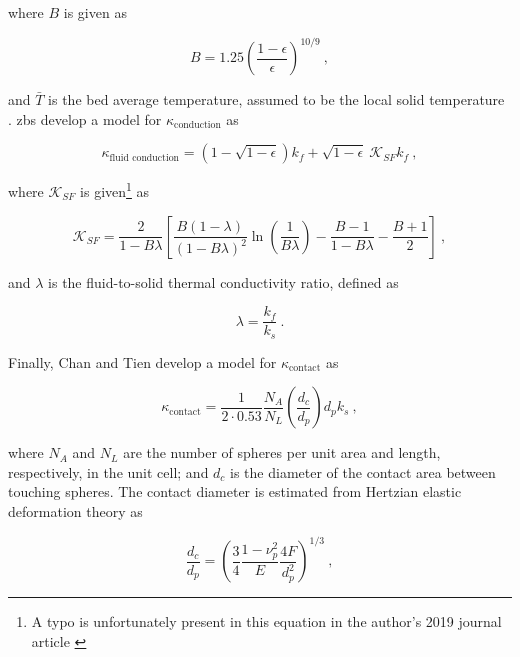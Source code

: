 \noindent where \(B\) is given as

\begin{equation}
\label{eq:KappaB}
B=1.25\left(\frac{1-\epsilon}{\epsilon}\right)^{10/9}\ ,
\end{equation}

\noindent and \(\bar{T}\) is the bed average temperature, assumed to be the local solid temperature \cite{auwerda_2011,breitbach}. \gls{zbs} develop a model for \(\kappa_\text{conduction}\) as \cite{tsotsas1987}

\begin{equation}
\label{eq:KappaFluidConductionZS}
\kappa_{\textrm{fluid conduction}}=\left(1-\sqrt{1-\epsilon}\right)k_f+\sqrt{1-\epsilon}\ \mathscr{K}_{SF}k_f\ ,
\end{equation}

\noindent where \(\mathscr{K}_{SF}\) is given\hspace{0.01cm}\footnote{A typo is unfortunately present in this equation in the author's 2019 journal article \cite{novak_sana}} as

\begin{equation}
\label{eq:ZBSKSF}
\mathscr{K}_{SF}=\frac{2}{1-B\lambda}\left\lbrack\frac{B(1-\lambda)}{(1-B\lambda)^2}\ln\left({\frac{1}{B\lambda}}\right)-\frac{B-1}{1-B\lambda}-\frac{B+1}{2}\right\rbrack\ ,
\end{equation}

\noindent and \(\lambda\) is the fluid-to-solid thermal conductivity ratio, defined as

\begin{equation}
\label{eq:lambdaDef}
\lambda=\frac{k_f}{k_s}\ .
\end{equation}

\noindent Finally, Chan and Tien develop a model for \(\kappa_\text{contact}\) as \cite{chan}

\begin{equation}
\label{eq:KappaSolidConductionCT}
\kappa_\text{contact}=\frac{1}{2\cdot0.53}\frac{N_A}{N_L}\left(\frac{d_c}{d_p}\right)d_pk_s\ ,
\end{equation}

\noindent where \(N_A\) and \(N_L\) are the number of spheres per unit area and length, respectively, in the unit cell; and \(d_c\) is the diameter of the contact area between touching spheres. The contact diameter is estimated from Hertzian elastic deformation theory as \cite{you}

\begin{equation}
\label{eq:ContactRadius}
\frac{d_c}{d_p}=\left(\frac{3}{4}\frac{1-\nu_p^2}{E}\frac{4F}{d_p^2}\right)^{1/3}\ ,
\end{equation}

